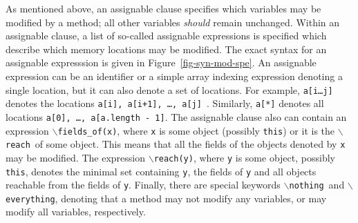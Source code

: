 \documentclass[a4paper]{llncs}
\newcommand{\java}{\textsc{Java}}
\newcommand{\fieldsofarg}[1]{\texttt{\(\backslash\)fields\_of(#1)}}
\newcommand{\reach}{\texttt{\(\backslash\)reach}}
\newcommand{\reacharg}[1]{\texttt{\(\backslash\)reach(#1)}}
\newcommand{\nothing}{\texttt{\(\backslash\)nothing}}
\newcommand{\everything}{\texttt{\(\backslash\)everything}}
\begin{document}
As mentioned above, an assignable clause specifies which variables may 
be modified by a method; all other variables \emph{should} remain
unchanged. Within an assignable clause, a list of so-called assignable 
expressions is specified which describe which memory locations may be
modified. The exact syntax for an assignable
expresssion is given in Figure~\ref{fig-syn-mod-spe}.
An assignable expression can be an identifier or a simple array
indexing expression denoting a single location, but it can also denote
a set of locations. For example,
\texttt{a[i\dots j]} denotes the locations
\texttt{a[i], a[i+1], \dots, a[j] }. Similarly,
\texttt{a[*]} denotes all locations
\texttt{a[0], \dots, a[a.length - 1]}. The assignable clause also can 
contain an expression
\fieldsofarg{x}, where \texttt{x} is some
object (possibly \texttt{this}) or it is the
\reach\ of some object. This means that all the
fields of the objects denoted by \texttt{x} may be modified. 
The expression \reacharg{y}, where \texttt{y} is some 
object, possibly \texttt{this}, denotes
the minimal set containing \texttt{y}, the fields of \texttt{y} and
all objects reachable from the fields of \texttt{y}.
Finally, there are special keywords \nothing\ and
\everything, denoting that a method may not modify 
any variables, or may modify all variables, respectively.
\end{document}
